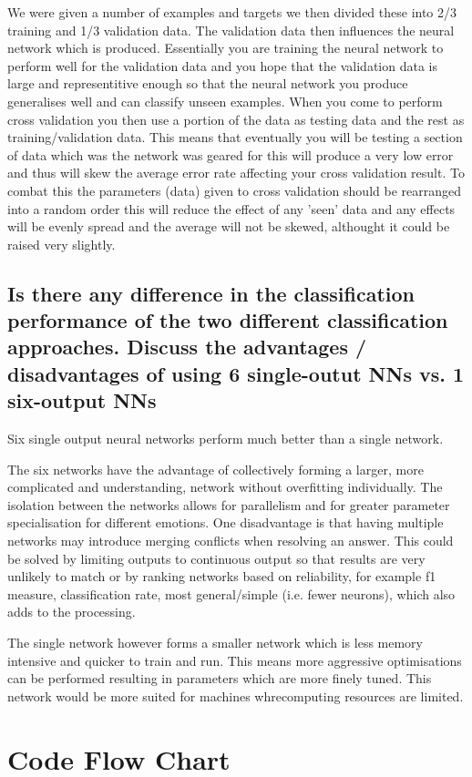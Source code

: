 \documentclass[11pt]{article}
\begin{document}
We were given a number of examples and targets we then divided these into  2/3 training and 1/3 validation data. The validation data then influences the neural network which is produced. Essentially you are training the neural network to perform well for the validation data and you hope that the validation data is large and representitive enough so that the neural network you produce generalises well and can classify unseen examples. When you come to perform cross validation you then use a portion of the data as testing data and the rest as training/validation data. This means that eventually you will be testing a section of data which was the network was geared for this will produce a very low error and thus will skew the average error rate affecting your cross validation result. To combat this the parameters (data) given to cross validation should be rearranged into a random order this will reduce the effect of any 'seen' data and any effects will be evenly spread and the average will not be skewed, althought it could be raised very slightly.

\subsection{Is there any difference in the classification performance of the two different classification approaches. Discuss the advantages / disadvantages of using 6 single-outut NNs vs. 1 six-output NNs}

Six single output neural networks perform much better than a single network. 

The six networks have the advantage of collectively forming a larger, more complicated and understanding, network without overfitting individually. The isolation between the networks allows for parallelism and for greater parameter specialisation for different emotions. One disadvantage is that having multiple networks may introduce merging conflicts when resolving an answer. This could be solved by limiting outputs to continuous output so that results are very unlikely to match or by ranking networks based on reliability, for example f1 measure, classification rate, most general/simple (i.e. fewer neurons), which also adds to the processing.

The single network however forms a smaller network which is less memory intensive and quicker to train and run. This means more aggressive optimisations can be performed resulting in parameters which are more finely tuned. This network would be more suited for machines whrecomputing resources are limited.

\section{Code Flow Chart}
\end{document}
